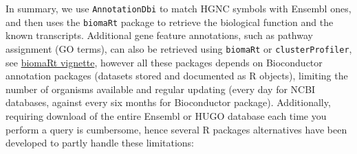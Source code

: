 \begin{Shaded}
\begin{Highlighting}
\OtherTok{\textless{}{-}}\SpecialCharTok{::}\NormalTok{(} \NormalTok{(}\NormalTok{, }\NormalTok{), }\NormalTok{(}\NormalTok{),}
                                  \SpecialCharTok{\%\textgreater{}\%}\SpecialCharTok{::}\SpecialCharTok{\%\textgreater{}\%}
\SpecialCharTok{::}\SpecialCharTok{\%\textgreater{}\%}
\SpecialCharTok{::}\NormalTok{(} \NormalTok{(}\NormalTok{(}\SpecialCharTok{::}\NormalTok{())}\ErrorTok{)}


\OtherTok{\textless{}{-}}\SpecialCharTok{\%\textgreater{}\%}
\SpecialCharTok{::} \NormalTok{) }\SpecialCharTok{\%\textgreater{}\%}
\SpecialCharTok{::}\NormalTok{(}
\OtherTok{\textless{}{-}}\SpecialCharTok{\%\textgreater{}\%}\SpecialCharTok{::} \NormalTok{)}
\OtherTok{\textless{}{-}}\SpecialCharTok{\%\textgreater{}\%}\SpecialCharTok{::} \NormalTok{)}
\end{Highlighting}
\end{Shaded}

In summary, we use \texttt{AnnotationDbi} to match HGNC symbols with Ensembl ones, and then uses the \texttt{biomaRt} package to retrieve the biological function and the known transcripts. Additional gene feature annotations, such as pathway assignment (GO terms), can also be retrieved using \texttt{biomaRt} or \texttt{clusterProfiler}, see \href{https://bioconductor.org/packages/release/bioc/vignettes/biomaRt/inst/doc/}{biomaRt vignette}, however all these packages depends on Bioconductor annotation packages (datasets stored and documented as R objects), limiting the number of organisms available and regular updating (every day for NCBI databases, against every six months for Bioconductor package). Additionally, requiring download of the entire Ensembl or HUGO database each time you perform a query is cumbersome, hence several R packages alternatives have been developed to partly handle these limitations:

